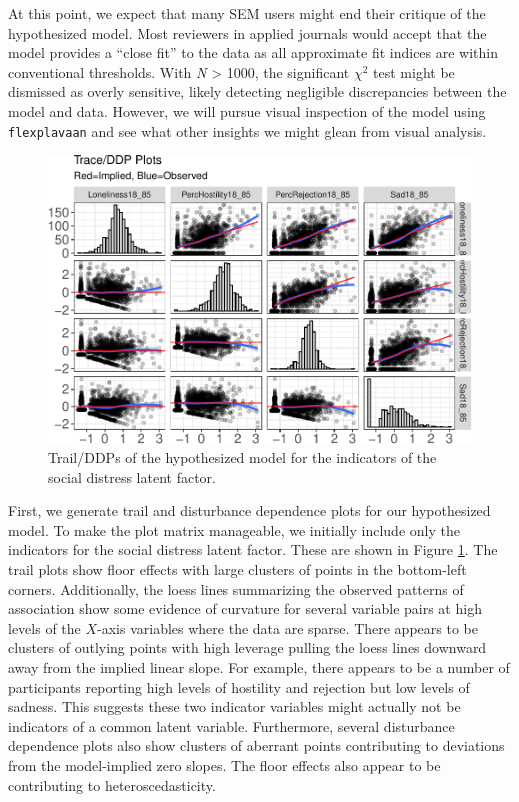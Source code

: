 \documentclass[
  english,
  man]{apa6}
\begin{document}
At this point, we expect that many SEM users might end their critique of the hypothesized model. Most reviewers in applied journals would accept that the model provides a ``close fit'' to the data as all approximate fit indices are within conventional thresholds. With \emph{N} \textgreater{} 1000, the significant \(\chi^2\) test might be dismissed as overly sensitive, likely detecting negligible discrepancies between the model and data. However, we will pursue visual inspection of the model using \texttt{flexplavaan} and see what other insights we might glean from visual analysis.

\begin{figure}

{\centering \includegraphics[width=0.9\linewidth]{flexplavaan_draft_files/figure-latex/trailreal-1} 

}

\caption{Trail/DDPs of the hypothesized model for the indicators of the social distress latent factor.}\label{fig:trailreal}
\end{figure}

First, we generate trail and disturbance dependence plots for our hypothesized model. To make the plot matrix manageable, we initially include only the indicators for the social distress latent factor. These are shown in Figure \ref{fig:trailreal}. The trail plots show floor effects with large clusters of points in the bottom-left corners. Additionally, the loess lines summarizing the observed patterns of association show some evidence of curvature for several variable pairs at high levels of the \(X\)-axis variables where the data are sparse. There appears to be clusters of outlying points with high leverage pulling the loess lines downward away from the implied linear slope. For example, there appears to be a number of participants reporting high levels of hostility and rejection but low levels of sadness. This suggests these two indicator variables might actually not be indicators of a common latent variable. Furthermore, several disturbance dependence plots also show clusters of aberrant points contributing to deviations from the model-implied zero slopes. The floor effects also appear to be contributing to heteroscedasticity.
\end{document}
